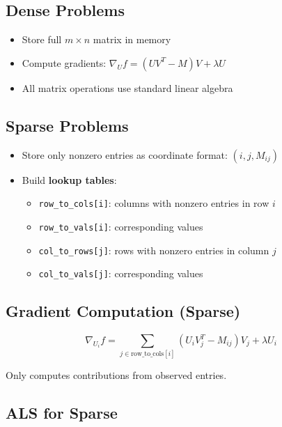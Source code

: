 \documentclass[11pt,oneside]{article}
\newcommand{\defn}[1]{\textbf{#1}}
\newcommand{\grad}{\nabla}
\begin{document}
\subsection*{Dense Problems}

\begin{itemize}
    \item Store full $m \times n$ matrix in memory
    \item Compute gradients: $\grad_U f = (UV^T - M)V + \lambda U$
    \item All matrix operations use standard linear algebra
\end{itemize}

\subsection*{Sparse Problems}

\begin{itemize}
    \item Store only nonzero entries as coordinate format: $(i, j, M_{ij})$
    \item Build \defn{lookup tables}:
    \begin{itemize}
        \item \texttt{row\_to\_cols[i]}: columns with nonzero entries in row $i$
        \item \texttt{row\_to\_vals[i]}: corresponding values
        \item \texttt{col\_to\_rows[j]}: rows with nonzero entries in column $j$
        \item \texttt{col\_to\_vals[j]}: corresponding values
    \end{itemize}
\end{itemize}

\subsection*{Gradient Computation (Sparse)}

\begin{equation}
    \grad_{U_i} f = \sum_{j \in \text{row\_to\_cols}[i]} (U_i V_j^T - M_{ij})V_j + \lambda U_i
\end{equation}

Only computes contributions from observed entries.

\subsection*{ALS for Sparse}
\end{document}
